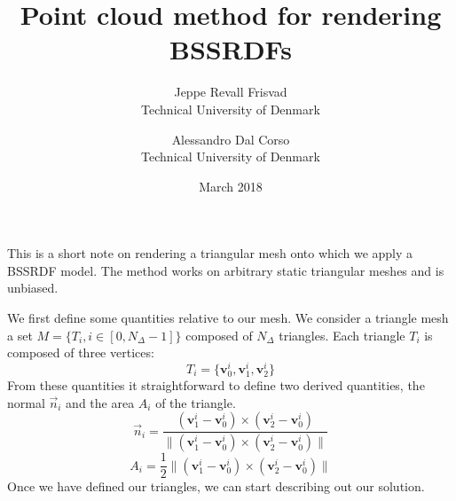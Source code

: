 \documentclass[10pt,a4paper]{article}
\title{Point cloud method for rendering BSSRDFs}
\date{March 2018}
\author{Jeppe Revall Frisvad \\ Technical University of Denmark
\and Alessandro Dal Corso \\ Technical University of Denmark}
\begin{document}
\maketitle
\newcommand{\vecfunc}[2] {\vec{#1}(\mathbf{#2})}
\newcommand{\func}[2] {{#1}(\mathbf{#2})}
\newcommand{\omegafunc}[2] {{#1}(\mathbf{#2}, \vec{\omega})}

\newcommand{\xvecfunc}[1] {\vecfunc{#1}{x}}
\newcommand{\xfunc}[1] {\func{#1}{x}}
\newcommand{\xomegafunc}[1] {\omegafunc{#1}{x}}
\newcommand{\nablavec} {{\nabla}}
\newcommand{\omegavec} {\vec{\omega}}
\newcommand{\sphere}[2] {\int_{4\pi}{#1}\ d{\ifthenelse{\isempty{#2}{}}{{\omega}}{#2}}}
\newcommand{\hemisphere}[2] {\int_{2\pi_+}{#1}\ d{\ifthenelse{\isempty{#2}{}}{{\omega}}{#2}}}
\newcommand{\inwardhemisphere}[2] {\int_{2\pi_-}{#1}\ d{\ifthenelse{\isempty{#2}{}}{{\omega}}{#2}}}

\newcommand{\absorption}{\sigma_a}
\newcommand{\transmission}{\sigma_{tr}}
\newcommand{\scattering}{\sigma_s}
\newcommand{\extinction}{\sigma_t}
\newcommand{\fluence}{G_0}
\newcommand{\flux}{\mathbf{G}_1}
\newcommand{\sourcezero}[1]{\func{q}{#1}}
\newcommand{\sourcezerox}{\xfunc{q}}
\newcommand{\sourceone}[1]{\vec{\mathbf{Q}}(\mathbf{#1}, \omegavec)}
\newcommand{\sourceonex}{\vec{\mathbf{Q}}(\mathbf{x}, \omegavec)}
\newcommand{\redsca}{{\sigma}'_s}
\newcommand{\redext}{{\sigma}'_t}
\newcommand{\redscaEddington}{\tilde{\sigma}_s}
\newcommand{\redextEddington}{\tilde{\sigma}_t}
\newcommand{\de}{\text{d}}
\newcommand{\cphi}{C_{\phi}}
\newcommand{\cE}{C_{\mathbf{E}}}


This is a short note on rendering a triangular mesh onto which we apply a BSSRDF model. The method works on arbitrary static triangular meshes and is unbiased.

We first define some quantities relative to our mesh. We consider a triangle mesh a set $M = \{T_i, i \in [0, N_\Delta - 1] \}$ composed of $N_{\Delta}$ triangles. Each triangle $T_i$ is composed of three vertices:
$$
T_i = \{ \mathbf{v}^i_0, \mathbf{v}^i_1, \mathbf{v}^i_2 \}
$$
From these quantities it straightforward to define two derived quantities, the normal $\vec{n}_i$ and the area $A_i$ of the triangle. 
$$
\vec{n}_i = \frac{(\mathbf{v}^i_1 - \mathbf{v}^i_0) \times (\mathbf{v}^i_2 - \mathbf{v}^i_0) }{ \|(\mathbf{v}^i_1 - \mathbf{v}^i_0) \times (\mathbf{v}^i_2 - \mathbf{v}^i_0)  \|}
$$
$$
A_i = \frac{1}{2} \|(\mathbf{v}^i_1 - \mathbf{v}^i_0) \times (\mathbf{v}^i_2 - \mathbf{v}^i_0) \|
$$
Once we have defined our triangles, we can start describing out our solution. 
\end{document}
